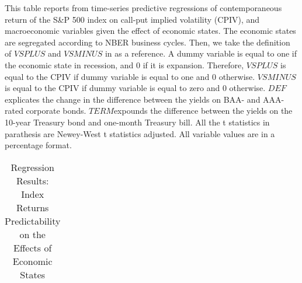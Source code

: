 \begin{table}[h]

\caption{Regression Results: Index Returns Predictability on the Effects of Economic States}\label{table:EcoStates}
\begin{threeparttable}

\medskip
\begin{spacing}{1.1}
{\scriptsize  
This table reports from time-series predictive regressions of contemporaneous return of the S\&P 500 index on call-put implied volatility (CPIV), and macroeconomic variables given the effect of economic states. The economic states are segregated according to NBER business cycles. Then, we take the definition of $VSPLUS$ and $VSMINUS$ in \textcite{atilgan2015implied} as a reference. A dummy variable is equal to one if the economic state in recession, and 0 if it is expansion. Therefore, $VSPLUS$ is equal to the CPIV if dummy variable is equal to one and 0 otherwise. $VSMINUS$ is equal to the CPIV if dummy variable is equal to zero and 0 otherwise. $DEF$ explicates the change in the difference between the yields on BAA- and AAA-rated corporate bonds. $TERM $expounds the difference between the yields on the 10-year Treasury bond and one-month Treasury bill. All the t statistics in parathesis are Newey-West t statistics adjusted. All variable values are in a percentage format. 
}
\end{spacing}
\medskip
\medskip
\tiny
\centering
\begin{tabular}{ccccccccccccccc}
\toprule


\end{tabular}
\end{threeparttable}
\end{table}
